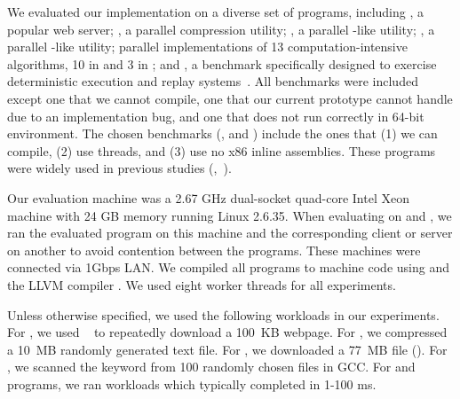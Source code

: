 We evaluated our \peregrine implementation on a diverse set of \nprog programs,
including \apache, a popular web server; \pbzip, a parallel compression
utility; \aget, a parallel -like utility; \pfscan, a parallel
-like utility; parallel implementations of 13
computation-intensive algorithms, 10 in \splash and 3 in \parsec; and
\racey, a benchmark specifically designed to exercise deterministic
execution and replay systems~\cite{racy-stress}.  All \splash benchmarks
were included except one that we cannot compile, one that our current prototype
cannot handle due to an implementation bug, and one that does not run
correctly in 64-bit environment.  The chosen \parsec benchmarks
(\blackscholes, \swaptions and \streamcluster) include the ones that (1)
we can compile, (2) use threads, and (3) use no x86 inline assemblies.
These programs were widely used in previous studies (\eg,~\cite{lu:concurrency-bugs,syncfinder:osdi10,grace:oopsla09}).

Our evaluation machine was a 2.67 GHz dual-socket quad-core Intel Xeon
machine with 24 GB memory running Linux 2.6.35.  When evaluating \peregrine on
\apache and \aget, we ran the evaluated program on this machine and the
corresponding client or server on another to avoid contention
between the programs.  These machines were connected via 1Gbps LAN.  We
compiled all programs to machine code using  and the
LLVM compiler .  We used eight worker threads for all
experiments.

Unless otherwise specified, we used the following workloads in our
experiments.  For \apache, we used \ab~\cite{apachebench} to repeatedly
download a 100~KB webpage. For \pbzip, we compressed a 10~MB randomly
generated text file.
For \aget, we downloaded a 77~MB file (). 
For \pfscan, we scanned the keyword  from 100 randomly chosen
files in GCC.  For \splash and \parsec programs, 
we ran workloads which typically completed in 1-100 ms.

